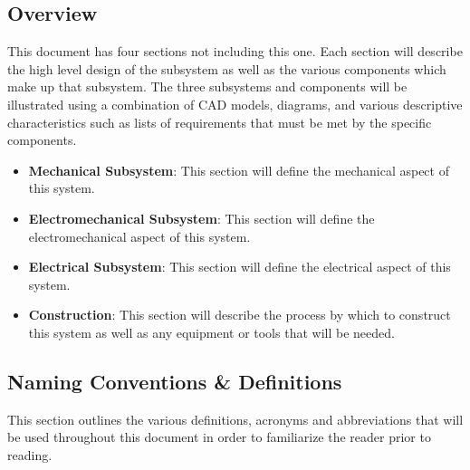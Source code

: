 \documentclass[titlepage]{article}
\begin{document}
\subsection{Overview}
This document has four sections not including this one. Each section will describe the high level design of the subsystem as well as the various components which make up that subsystem. The three subsystems and components will be illustrated using a combination of CAD models, diagrams, and various descriptive characteristics such as lists of requirements that must be met by the specific components.\\
\begin{itemize}
	\item \textbf{Mechanical Subsystem}: This section will define the mechanical aspect of this system.\\
	\item \textbf{Electromechanical Subsystem}: This section will define the electromechanical aspect of this system.\\
	\item \textbf{Electrical Subsystem}: This section will define the electrical aspect of this system.\\
	\item \textbf{Construction}: This section will describe the process by which to construct this system as well as any equipment or tools that will be needed.\\
\end{itemize}
\newpage
\subsection{Naming Conventions \& Definitions}
This section outlines the various definitions, acronyms and abbreviations that will be used throughout this document in order to familiarize the reader prior to reading.
\end{document}
